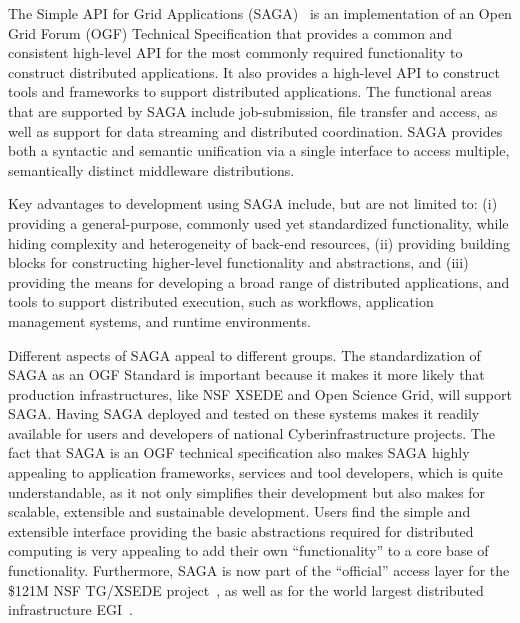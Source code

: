 \documentclass[]{svjour3}
\begin{document}
 The Simple API for Grid Applications
(SAGA)~\cite{saga_url} is an implementation of an Open Grid Forum
(OGF) Technical Specification that provides a common and consistent
high-level API for the most commonly required functionality to
construct distributed applications. It also provides a high-level API
to construct tools and frameworks to support distributed
applications. The functional areas that are supported by SAGA include
job-submission, file transfer and access, as well as support for data
streaming and distributed coordination. SAGA provides both a syntactic
and semantic unification via a single interface to access multiple,
semantically distinct middleware distributions.

Key advantages to development using SAGA include, but are not limited to:
(i) providing a general-purpose, commonly used yet standardized functionality, while
hiding complexity and heterogeneity of back-end resources, (ii)
providing building blocks for constructing higher-level functionality
and abstractions, and (iii) providing the means for developing a broad
range of distributed applications, and tools to support distributed
execution, such as workflows, application management systems, and runtime environments.

 Different aspects of SAGA appeal to
different groups. The standardization of SAGA as an OGF Standard is
important because it makes it more likely that production
infrastructures, like NSF XSEDE and Open Science Grid, will support
SAGA. Having SAGA deployed and tested on these systems makes it
readily available for users and developers of national
Cyberinfrastructure projects. The fact that SAGA is an OGF technical
specification also makes SAGA highly appealing to application
frameworks, services and tool developers, which is quite
understandable, as it not only simplifies their development but also
makes for scalable, extensible and sustainable development. Users find
the simple and extensible interface providing the basic abstractions
required for distributed computing is very appealing to add their own
“functionality” to a core base of functionality. Furthermore, SAGA is
now part of the “official” access layer for the \$121M NSF TG/XSEDE
project~, as well as for the world largest
distributed infrastructure EGI~.
\end{document}
